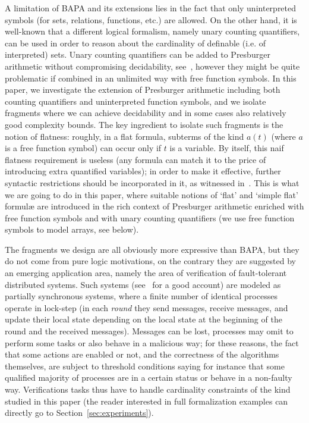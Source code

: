 \documentclass[11pt,a4paper]{article}
\newcommand{\formulae}{formul\ae\xspace}
\begin{document}
A limitation of BAPA and its extensions lies in the fact that only uninterpreted symbols (for sets, relations, functions, etc.) are allowed. On the other hand, 
it is well-known that a different logical formalism, namely
unary counting quantifiers, can be used  in order to reason about the cardinality of definable (i.e. of interpreted) sets.  
Unary counting quantifiers can be added to Presburger arithmetic without compromising  decidability, see~\cite{schweikhart}, 
however they might be quite problematic if combined in an unlimited way with free function symbols.
In this paper, we investigate the extension of Presburger arithmetic including both counting quantifiers and uninterpreted function symbols, and we isolate fragments where we can achieve decidability and in some cases also relatively good complexity bounds. The key ingredient to isolate such fragments is the notion of flatness: roughly, in a flat formula, subterms of the kind $a(t)$ (where $a$ is a free function symbol) can occur only if $t$ is a variable. By itself, this naif flatness requirement is useless (any formula can match it to the price of introducing extra quantified variables); 
in order to make it effective, further 
 syntactic restrictions should be incorporated in it, as witnessed in~\cite{AlbertiGS14}. This is what we are going to do in  this paper, where suitable notions of `flat' and `simple flat' \formulae are introduced
 in the rich context of Presburger arithmetic enriched with free function symbols  and with unary counting quantifiers (we use free function symbols to model arrays, see below).

The fragments we design are all obviously more expressive than BAPA, but they do not come from pure logic motivations, on the contrary they are suggested by an emerging  application area, 
namely the area of verification of fault-tolerant distributed systems.
Such systems (see~\cite{zufferey} for a good account)  are modeled as partially synchronous systems, where a finite number of identical
 processes operate  in lock-step (in each \textit{round} they send messages,
receive messages, and update their local state depending on the local state at the beginning of
the round and the received messages). Messages can be lost, processes may omit to perform some tasks or also behave in a malicious way; for these reasons, 
the fact that some actions  are enabled or not, and the correctness of the algorithms themselves,  are subject to threshold conditions saying for instance  that
some qualified majority of processes are in a certain status or behave in a non-faulty way. Verifications tasks thus have to handle  cardinality constraints
of the kind studied in this paper (the reader interested in full formalization examples can directly go to Section~\ref{sec:experiments}).
\end{document}
